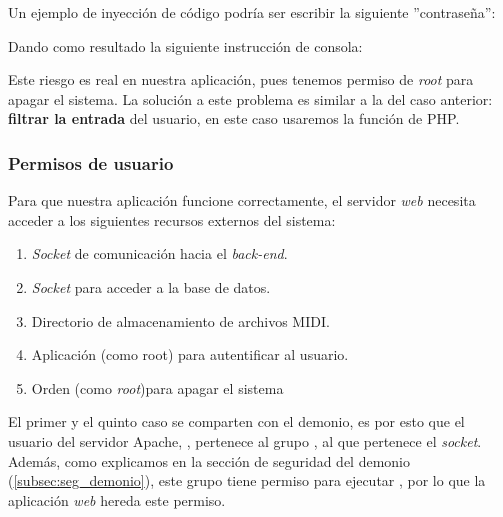\begin{center}
\end{center}

Un ejemplo de inyección de código podría ser escribir la siguiente ''contraseña'':

\begin{center}
\end{center}

Dando como resultado la siguiente instrucción de consola:

\begin{center}
\end{center}

Este riesgo es real en nuestra aplicación, pues tenemos permiso de \textit{root} para apagar el sistema. La solución a este problema es similar a la del caso anterior: \textbf{filtrar la entrada} del usuario, en este caso usaremos la función  de \acrshort{PHP}.

\subsubsection{Permisos de usuario}

Para que nuestra aplicación funcione correctamente, el servidor \textit{web} necesita acceder a los siguientes recursos externos del sistema:

\begin{enumerate}
	\item \textit{Socket} de comunicación hacia el \textit{back-end}.
	\item \textit{Socket} para acceder a la base de datos.
	\item Directorio de almacenamiento de archivos \acrshort{MIDI}.
	\item Aplicación  (como root) para autentificar al usuario.
	\item Orden  (como \textit{root})para apagar el sistema
\end{enumerate}

El primer y el quinto caso se comparten con el demonio, es por esto que el usuario del servidor Apache, , pertenece al grupo , al que pertenece el \textit{socket}. Además, como explicamos en la sección de seguridad del demonio (\ref{subsec:seg_demonio}), este grupo tiene permiso para ejecutar , por lo que la aplicación \textit{web} hereda este permiso.


